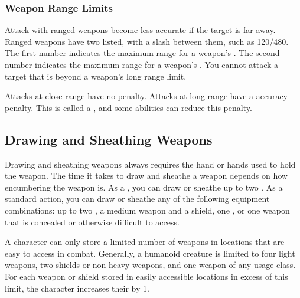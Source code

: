         \subsubsection{Weapon Range Limits}\label{Weapon Range Limits}
            Attack with ranged weapons become less accurate if the target is far away.
            Ranged weapons have two  listed, with a slash between them, such as 120/480.
            The first number indicates the maximum range for a weapon's .
            The second number indicates the maximum range for a weapon's .
            You cannot attack a target that is beyond a weapon's long range limit.

            Attacks at close range have no penalty.
            Attacks at long range have a  accuracy penalty.
            This is called a , and some abilities can reduce this penalty.

    \subsection{Drawing and Sheathing Weapons}\label{Drawing and Sheathing Weapons}
        Drawing and sheathing weapons always requires the hand or hands used to hold the weapon.
        The time it takes to draw and sheathe a weapon depends on how encumbering the weapon is.
        As a , you can draw or sheathe up to two .
        As a standard action, you can draw or sheathe any of the following equipment combinations: up to two , a medium weapon and a shield, one , or one weapon that is concealed or otherwise difficult to access.

        A character can only store a limited number of weapons in locations that are easy to access in combat.
        Generally, a humanoid creature is limited to four light weapons, two shields or non-heavy weapons, and one weapon of any usage class.
        For each weapon or shield stored in easily accessible locations in excess of this limit, the character increases their  by 1.

